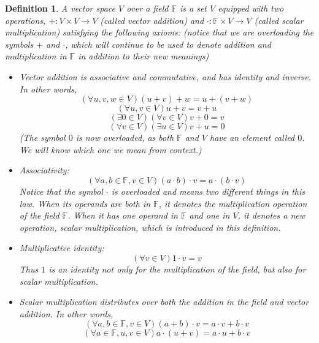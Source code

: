 \documentclass[12pt]{article}
\newcounter{prmc}
\newtheorem{dfn}[prmc]{Definition}
\begin{document}
\begin{dfn}
  A vector space $V$ over a field $\mathbb{F}$ is a set $V$ equipped
  with two operations, $+:V\times V\rightarrow V$ (called vector
  addition) and $\cdot:\mathbb{F}\times V\rightarrow V$ (called scalar
  multiplication) satisfying the following axioms: (notice that we are
  overloading the symbols $+$ and $\cdot$, which will continue to be
  used to denote addition and multiplication in $\mathbb{F}$ in
  addition to their new meanings) 
  \begin{itemize}
  \item Vector addition is associative and commutative, and has identity and inverse.  In other words,
    $$ (\forall u,v,w\in V)(u+v)+w=u+(v+w)$$
    $$ (\forall u,v\in V)u+v=v+u$$
    $$ (\exists 0\in V)(\forall v\in V)v+0=v$$
    $$ (\forall v\in V)(\exists u\in V)v+u=0$$ (The symbol $0$ is now
    overloaded, as both $\mathbb{F}$ and $V$ have an element called
    $0$.  We will know which one we mean from context.)
  \item Associativity:
    $$ (\forall a,b\in\mathbb{F}, v\in V)(a\cdot b)\cdot
    v=a\cdot(b\cdot v)$$ Notice that the symbol $\cdot$ is overloaded
    and means two different things in this law.  When its operands are
    both in $\mathbb{F}$, it denotes the multiplication operation of
    the field $\mathbb{F}$.  When it has one operand in $\mathbb{F}$
    and one in $V$, it denotes a new operation, scalar multiplication,
    which is introduced in this definition.
  \item Multiplicative identity:
    $$ (\forall v\in V) 1\cdot v=v$$ Thus $1$ is an identity not only
    for the multiplication of the field, but also for scalar
    multiplication.
  \item Scalar multiplication distributes over both the addition in
    the field and vector addition.  In other words,
    $$(\forall a,b\in\mathbb{F}, v\in V) (a+b)\cdot v=a\cdot v+ b\cdot v$$
    $$(\forall a\in\mathbb{F}, u,v\in V) a\cdot (u+v)=a\cdot u+b\cdot v$$
  \end{itemize}  
\end{dfn}
\end{document}
